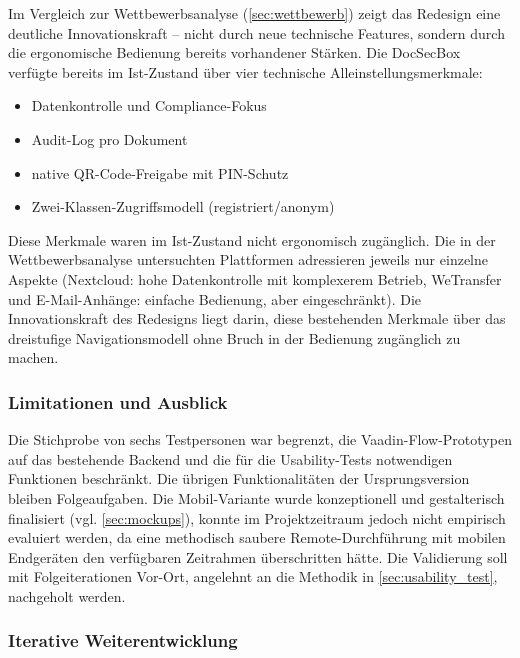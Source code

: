 Im Vergleich zur Wettbewerbsanalyse (\autoref{sec:wettbewerb}) zeigt das Redesign eine deutliche Innovationskraft -- nicht durch neue technische Features, sondern durch die ergonomische Bedienung bereits vorhandener Stärken. Die DocSecBox verfügte bereits im Ist-Zustand über vier technische Alleinstellungsmerkmale:

\begin{itemize}
    \item Datenkontrolle und Compliance-Fokus
    \item Audit-Log pro Dokument
    \item native QR-Code-Freigabe mit PIN-Schutz
    \item Zwei-Klassen-Zugriffsmodell (registriert/anonym)
\end{itemize}

Diese Merkmale waren im Ist-Zustand nicht ergonomisch zugänglich. Die in der Wettbewerbsanalyse untersuchten Plattformen adressieren jeweils nur einzelne Aspekte (Nextcloud: hohe Datenkontrolle mit komplexerem Betrieb, WeTransfer und E-Mail-Anhänge: einfache Bedienung, aber eingeschränkt). Die Innovationskraft des Redesigns liegt darin, diese bestehenden Merkmale über das dreistufige Navigationsmodell ohne Bruch in der Bedienung zugänglich zu machen.

\subsubsection{Limitationen und Ausblick}\label{subsec:limitationen}

Die Stichprobe von sechs Testpersonen war begrenzt, die Vaadin-Flow-Prototypen auf das bestehende Backend und die für die Usability-Tests notwendigen Funktionen beschränkt. Die übrigen Funktionalitäten der Ursprungsversion bleiben Folgeaufgaben. Die Mobil-Variante wurde konzeptionell und gestalterisch finalisiert (vgl. \autoref{sec:mockups}), konnte im Projektzeitraum jedoch nicht empirisch evaluiert werden, da eine methodisch saubere Remote-Durchführung mit mobilen Endgeräten den verfügbaren Zeitrahmen überschritten hätte. Die Validierung soll mit Folgeiterationen Vor-Ort, angelehnt an die Methodik in \autoref{sec:usability_test}, nachgeholt werden.

\subsubsection{Iterative Weiterentwicklung}\label{subsec:iterative_weiterentwicklung}

